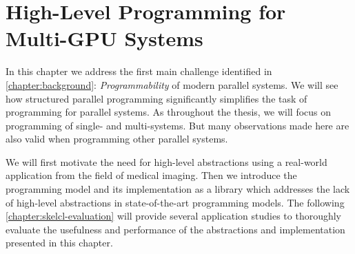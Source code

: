 
\chapter{High-Level Programming for Multi-GPU Systems}

\label{chapter:skelcl}

In this chapter we address the first main challenge identified in \autoref{chapter:background}: \emph{Programmability} of modern parallel systems.
We will see how structured parallel programming significantly simplifies the task of programming for parallel systems.
As throughout the thesis, we will focus on programming of single- and multi-\GPU systems.
But many observations made here are also valid when programming other parallel systems.

We will first motivate the need for high-level abstractions using a real-world \OpenCL application from the field of medical imaging.
Then we introduce the \emph{\SkelCL} programming model and its implementation as a \Cpp library which addresses the lack of high-level abstractions in state-of-the-art \GPU programming models.
The following \autoref{chapter:skelcl-evaluation} will provide several application studies to thoroughly evaluate the usefulness and performance of the abstractions and implementation presented in this chapter.









